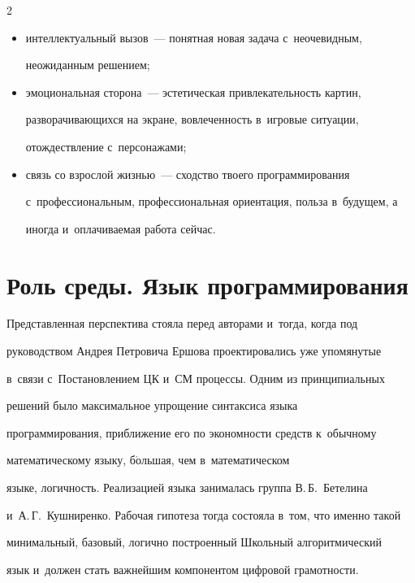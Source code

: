 \begin{multicols}{2}
  \begin{itemize}


\item интеллектуальный вызов~--- понятная новая задача с~неочевидным, 


неожиданным решением;


\item эмоциональная сторона~--- эстетическая привлекательность картин, 


разворачивающихся на экране, вовлеченность в~игровые ситуации, 


отождествление с~персонажами;


\item связь со взрослой жизнью~--- сходство твоего программирования 


с~профессиональным, профессиональная ориентация, польза в~будущем, а 


иногда и~оплачиваемая работа сейчас.


  \end{itemize}


  


\section{Роль среды. Язык программирования}





  Представленная перспектива стояла перед  авторами и~тогда, когда под 


руководством Андрея Петровича Ершова  проектировались уже упомянутые 


в~связи с~Постановлением ЦК и~СМ процессы. Одним из принципиальных 


решений было максимальное упрощение синтаксиса языка 


программирования, приближение его по экономности средств к~обычному 


математическому языку, б$\acute{\mbox{о}}$льшая, чем в~математическом 


языке, логичность. Реализацией языка занималась группа В.\,Б.~Бетелина 


и~А.\,Г.~Кушниренко.  Рабочая гипотеза тогда состояла в~том, что именно такой 


минимальный, базовый, логично построенный Школьный алгоритмический 


язык и~должен  стать важнейшим компонентом цифровой грамотности.



\end{multicols}
